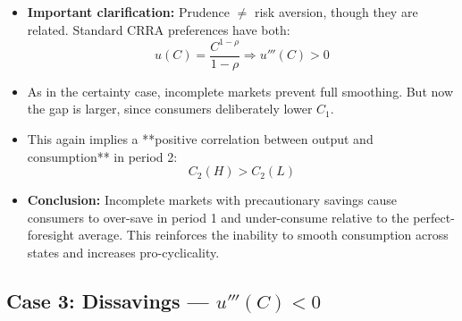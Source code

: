 \documentclass[12pt]{article}
\begin{document}
\begin{itemize}
    \item \textbf{Important clarification:}  
    Prudence $\neq$ risk aversion, though they are related. Standard CRRA preferences have both:
    \[
    u(C) = \frac{C^{1 - \rho}}{1 - \rho} \Rightarrow u'''(C) > 0
    \]
    
    \item As in the certainty case, incomplete markets prevent full smoothing. But now the gap is larger, since consumers deliberately lower $C_1$.
    
    \item This again implies a **positive correlation between output and consumption** in period 2:  
    \[
    C_2(H) > C_2(L)
    \]
    
    \item \textbf{Conclusion:}  
    Incomplete markets with precautionary savings cause consumers to over-save in period 1 and under-consume relative to the perfect-foresight average.  
    This reinforces the inability to smooth consumption across states and increases pro-cyclicality.
\end{itemize}

\subsection*{\noindent\textbf{Case 3: Dissavings --- $u'''(C) < 0$}}  
\end{document}
